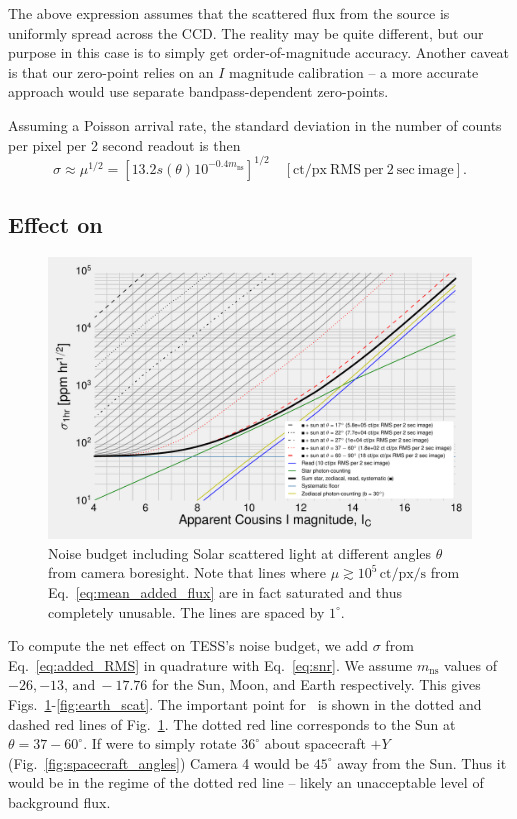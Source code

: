 The above expression assumes that the scattered flux from the source 
is uniformly spread across the CCD. The reality may be quite different,
but our purpose in this case is to simply get order-of-magnitude accuracy.
Another caveat is that our zero-point relies on an $I$ magnitude calibration -- 
a more accurate approach would use separate bandpass-dependent zero-points.

Assuming a Poisson arrival rate, the standard deviation in the number of counts 
per pixel per 2 second readout is then
\begin{equation}
\sigma \approx \mu^{1/2} = \left[ 13.2 s(\theta) 10^{-0.4 m_\mathrm{ns}} 
\right]^{1/2}\quad \mathrm{[ct/px\ RMS\ per\ 2\ sec\ image]}.
\label{eq:added_RMS}
\end{equation}

\subsection{Effect on  {\rm \npole}}
\label{sec:scattered_npole}
\begin{figure}[!t]
	\centering
	\includegraphics{figures/precision_angles_sun.pdf}
	\caption{Noise budget including Solar scattered light at different angles 
		$\theta$ from camera boresight. Note that lines where $\mu \gtrsim 
		10^5\,\mathrm{ct/px/s}$ from Eq.~\protect\ref{eq:mean_added_flux} are 
		in 
		fact 
		saturated and thus completely unusable. The lines are spaced by 
		$1^\circ$.} 
	\label{fig:sun_scat}
\end{figure}
To compute the net effect on TESS's noise budget, we add $\sigma$ from 
Eq.~\ref{eq:added_RMS} in quadrature with Eq.~\ref{eq:snr}.
We assume $m_\mathrm{ns}$ values of $-26,-13,\,\mathrm{and}\ -17.76$ for the 
Sun, Moon, and Earth respectively.
This gives Figs.~\ref{fig:sun_scat}-\ref{fig:earth_scat}.
The important point for \npole\ is shown in the dotted and dashed red lines of 
Fig.~\ref{fig:sun_scat}. 
The dotted red line corresponds to the Sun at $\theta=37-60^\circ$.
If \tess were to simply rotate $36^\circ$ about spacecraft $+Y$ 
(Fig.~\ref{fig:spacecraft_angles}) Camera 4 would be $45^\circ$
away from the Sun.
Thus it would be in the regime of the dotted red line -- likely an unacceptable 
level of background flux.

